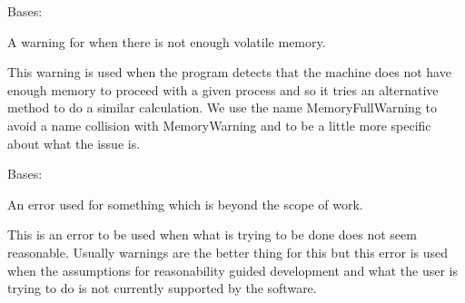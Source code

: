 \documentclass[letterpaper,11pt,english]{sphinxmanual}
\begin{document}
\begin{savenotes}\begin{fulllineitems}
\label{\detokenize{code/lezargus.library.logging:lezargus.library.logging.MemoryFullWarning}}
\pysigstartsignatures
{}
\pysigstopsignatures
\sphinxAtStartPar
Bases: {\hyperref[\detokenize{code/lezargus.library.logging:lezargus.library.logging.LezargusWarning}]{}}

\sphinxAtStartPar
A warning for when there is not enough volatile memory.

\sphinxAtStartPar
This warning is used when the program detects that the machine does not
have enough memory to proceed with a given process and so it tries an
alternative method to do a similar calculation. We use the name
MemoryFullWarning to avoid a name collision with MemoryWarning and to be a
little more specific about what the issue is.

\end{fulllineitems}\end{savenotes}


\begin{savenotes}\begin{fulllineitems}
\label{\detokenize{code/lezargus.library.logging:lezargus.library.logging.NotSupportedError}}
\pysigstartsignatures
{}
\pysigstopsignatures
\sphinxAtStartPar
Bases: {\hyperref[\detokenize{code/lezargus.library.logging:lezargus.library.logging.LezargusBaseError}]{}}

\sphinxAtStartPar
An error used for something which is beyond the scope of work.

\sphinxAtStartPar
This is an error to be used when what is trying to be done does not
seem reasonable. Usually warnings are the better thing for this but
this error is used when the assumptions for reasonability guided
development and what the user is trying to do is not currently supported
by the software.

\end{fulllineitems}\end{savenotes}
\end{document}
